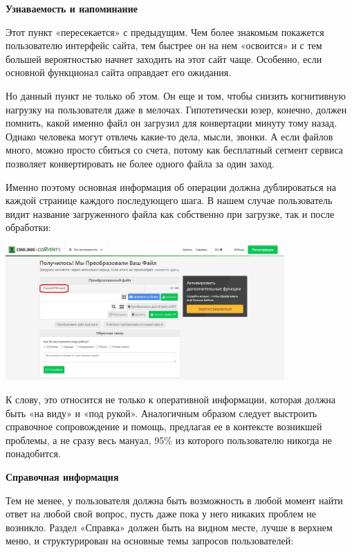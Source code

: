 \textbf{Узнаваемость и напоминание}

Этот пункт «пересекается» с предыдущим. Чем более знакомым покажется пользователю интерфейс сайта, тем быстрее он на нем «освоится» и с тем большей вероятностью начнет заходить на этот сайт чаще. Особенно, если основной функционал сайта оправдает его ожидания.

Но данный пункт не только об этом. Он еще и том, чтобы снизить когнитивную нагрузку на пользователя даже в мелочах. Гипотетически юзер, конечно, должен помнить, какой именно файл он загрузил для конвертации минуту тому назад. Однако человека могут отвлечь какие-то дела, мысли, звонки. А если файлов много, можно просто сбиться со счета, потому как бесплатный сегмент сервиса позволяет конвертировать не более одного файла за один заход.

Именно поэтому основная информация об операции должна дублироваться на каждой странице каждого последующего шага. В нашем случае пользователь видит название загруженного файла как собственно при загрузке, так и после обработки:

\begin{center}
    \includegraphics[width=0.8\textwidth]{img/cxp9.jpg}
\end{center}

К слову, это относится не только к оперативной информации, которая должна быть «на виду» и «под рукой». Аналогичным образом следует выстроить справочное сопровождение и помощь, предлагая ее в контексте возникшей проблемы, а не сразу весь мануал, 95\% из которого пользователю никогда не понадобится.


\textbf{Справочная информация}

Тем не менее, у пользователя должна быть возможность в любой момент найти ответ на любой свой вопрос, пусть даже пока у него никаких проблем не возникло. Раздел «Справка» должен быть на видном месте, лучше в верхнем меню, и структурирован на основные темы запросов пользователей:

